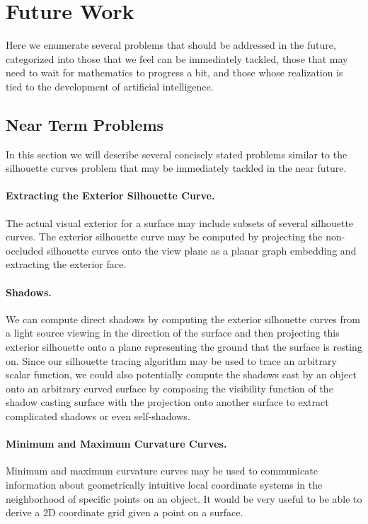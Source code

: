 \documentclass[12pt, letterpaper]{article}
\begin{document}
\section{Future Work}

Here we enumerate several problems that should be addressed in the future,
categorized into those that we feel can be immediately tackled, those that may need to wait for mathematics to progress a bit,
and those whose realization is tied to the development of artificial intelligence.

	\subsection{Near Term Problems}

	In this section we will describe several concisely stated problems similar to the silhouette curves problem that may be immediately tackled in the near future.

		\paragraph{Extracting the Exterior Silhouette Curve.}
		The actual visual exterior for a surface may include subsets of several silhouette curves. The exterior silhouette curve may be computed by projecting the
		non-occluded silhouette curves onto the view plane as a planar graph embedding and extracting the exterior face.		

		\paragraph{Shadows.}
		We can compute direct shadows	by computing the exterior silhouette curves from a light source viewing in the direction of the surface and then projecting this exterior silhouette 
		onto a plane representing the ground that the surface is resting on. Since our silhouette tracing algorithm may be used to trace an arbitrary
		scalar function, we could also potentially compute the shadows cast by an object onto an arbitrary curved surface by composing the 
		visibility function of the shadow casting surface with the projection onto another surface to extract complicated shadows or even self-shadows.

		\paragraph{Minimum and Maximum Curvature Curves.}
		Minimum and maximum curvature curves may be used to communicate information about geometrically intuitive local coordinate systems in the neighborhood of specific points on an object.
		It would be very useful to be able to derive a 2D coordinate grid given a point on a surface.
	
\end{document}
